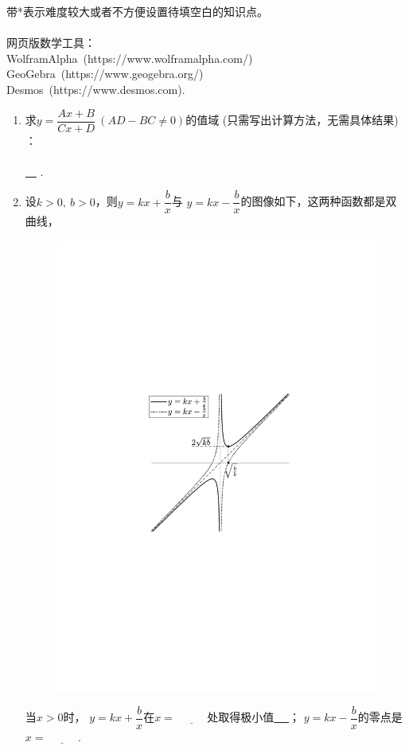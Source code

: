 \documentclass{article}
\newif\ifte
\begin{document}
\begin{multicols}{2}    

\noindent 带*表示难度较大或者不方便设置待填空白的知识点。\\
\\
网页版数学工具：\\
WolframAlpha\ (https://www.wolframalpha.com/) \\
GeoGebra\ (https://www.geogebra.org/) \\
Desmos\ (https://www.desmos.com).\\


\begin{enumerate}[leftmargin=20pt]

\section{函数}
\item 求$ y=\dfrac{Ax+B}{Cx+D}\ (AD-BC\neq 0) $的值域 
    \ifte \else (只需写出计算方法，无需具体结果) \fi：\\
\ifte  \underline{\ $ y=\dfrac{A}{C}\cdot\dfrac{x+
\dfrac{D}{C}-\dfrac{D}{C}+ \dfrac{B}{A}}{x+\dfrac{D}{C}}
=\dfrac{A}{C}\cdot\left(
1+\dfrac{-\dfrac{D}{C}+\dfrac{B}{A}}{x+\dfrac{D}{C}}\right)
 $ } \else \\ \underline{\  \hspace{8cm}\ } \fi .

\item 设$ k>0,\ b>0 $，则$ y=kx+\dfrac{b}{x} $与
$ y=kx-\dfrac{b}{x} $的图像如下，这两种函数都是双曲线，
\begin{figure}[H]
    \centering
    \includegraphics[width=0.6\linewidth]{两种双曲线_双钩与递增}
\end{figure}
当$ x>0 $时，
$ y=kx+\dfrac{b}{x} $在$ x=\underline{\ \ifte \sqrt{\dfrac{b}{k}}
  \else \hspace{1cm} \fi\ } $处取得极小值\underline{\ \ifte 
  $ 2\sqrt{kb} $\else \hspace{2cm} \fi\ }；
$ y=kx-\dfrac{b}{x} $的零点是$ x=\underline{\ \ifte \sqrt{\dfrac{b}{k}}
    \else \hspace{1cm} \fi\ } $.


\end{enumerate}
\end{multicols}
\end{document}
